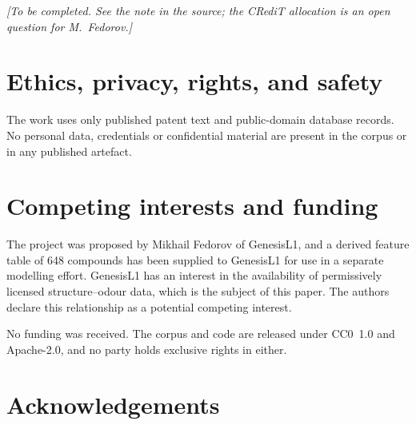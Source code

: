 \documentclass[
  computerscience
]{genesisl1-paper}
\begin{document}
%
%
\emph{[To be completed. See the note in the source; the CRediT allocation is an open
question for M.\ Fedorov.]}

\section*{Ethics, privacy, rights, and safety}

The work uses only published patent text and public-domain database records. No personal
data, credentials or confidential material are present in the corpus or in any published
artefact.

\section*{Competing interests and funding}

The project was proposed by Mikhail Fedorov of GenesisL1, and a derived feature table of
648 compounds has been supplied to GenesisL1 for use in a separate modelling effort.
GenesisL1 has an interest in the availability of permissively licensed structure--odour
data, which is the subject of this paper. The authors declare this relationship as a
potential competing interest.

No funding was received. The corpus and code are released under CC0~1.0 and Apache-2.0,
and no party holds exclusive rights in either.

\section*{Acknowledgements}
\end{document}
